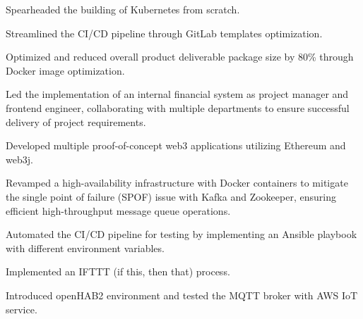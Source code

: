 \documentclass[]{deedy-resume-openfont}
\begin{document}
\begin{minipage}[t]{1\textwidth}
\null\hfill{}
\begin{tightemize}
    \item Spearheaded the building of Kubernetes from scratch.
    \item Streamlined the CI/CD pipeline through GitLab templates optimization.
    \item Optimized and reduced overall product deliverable package size by 80\% through Docker image optimization.
    \item Led the implementation of an internal financial system as project manager and frontend engineer, collaborating with multiple departments to ensure successful delivery of project requirements.
\end{tightemize}
\sectionsep

\null\hfill{}
\begin{tightemize}
    \item Developed multiple proof-of-concept web3 applications utilizing Ethereum and web3j.
\end{tightemize}
\sectionsep

\null\hfill{}
\begin{tightemize}
    \item Revamped a high-availability infrastructure with Docker containers to mitigate the single point of failure (SPOF) issue with Kafka and Zookeeper, ensuring efficient high-throughput message queue operations.
    \item Automated the CI/CD pipeline for testing by implementing an Ansible playbook with different environment variables.
\end{tightemize}
\sectionsep

\null\hfill{}
\begin{tightemize}
    \item Implemented an IFTTT (if this, then that) process.
    \item Introduced openHAB2 environment and tested the MQTT broker with AWS IoT service.
\end{tightemize}
\sectionsep


\end{minipage}
\end{document}
